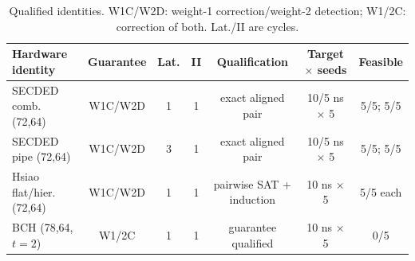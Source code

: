 \begin{table}[t]
\caption{Qualified identities. W1C/W2D: weight-1 correction/weight-2 detection; W1/2C: correction of both. Lat./II are cycles.}
\label{tab:matrix}
\centering\setlength{\tabcolsep}{4.0pt}
\begin{tabular}{@{}lcccccc@{}}
\toprule
Hardware identity & Guarantee & Lat. & II & Qualification & Target $\times$ seeds & Feasible \\
\midrule
SECDED comb. (72,64) & W1C/W2D & 1 & 1 & exact aligned pair & 10/5 ns $\times$ 5 & 5/5; 5/5 \\
SECDED pipe (72,64) & W1C/W2D & 3 & 1 & exact aligned pair & 10/5 ns $\times$ 5 & 5/5; 5/5 \\
Hsiao flat/hier. (72,64) & W1C/W2D & 1 & 1 & pairwise SAT + induction & 10 ns $\times$ 5 & 5/5 each \\
BCH (78,64,$t=2$) & W1/2C & 1 & 1 & guarantee qualified & 10 ns $\times$ 5 & 0/5 \\
\bottomrule
\end{tabular}
\end{table}
